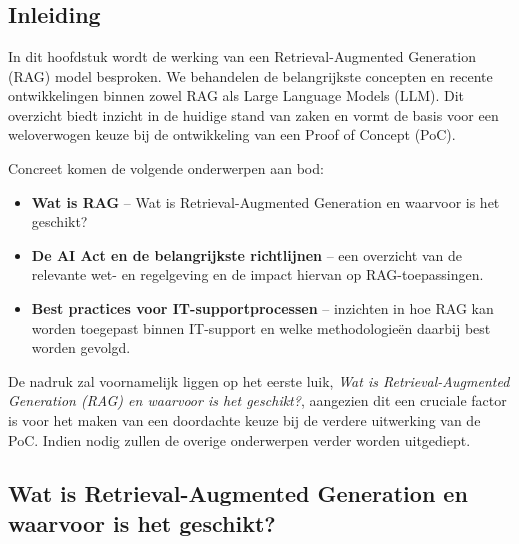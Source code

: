 \chapter{}%
\label{ch:stand-van-zaken}



\section{Inleiding}
In dit hoofdstuk wordt de werking van een Retrieval-Augmented Generation (RAG) model besproken. We behandelen de belangrijkste concepten en recente ontwikkelingen binnen zowel RAG als Large Language Models (LLM). Dit overzicht biedt inzicht in de huidige stand van zaken en vormt de basis voor een weloverwogen keuze bij de ontwikkeling van een Proof of Concept (PoC).

Concreet komen de volgende onderwerpen aan bod:
\begin{itemize}
    \item \textbf{Wat is RAG} – Wat is Retrieval-Augmented Generation en waarvoor is het geschikt?
    \item \textbf{De AI Act en de belangrijkste richtlijnen} – een overzicht van de relevante wet- en regelgeving en de impact hiervan op RAG-toepassingen.
    \item \textbf{Best practices voor IT-supportprocessen} – inzichten in hoe RAG kan worden toegepast binnen IT-support en welke methodologieën daarbij best worden gevolgd.
\end{itemize}

De nadruk zal voornamelijk liggen op het eerste luik, \textit{Wat is Retrieval-Augmented Generation (RAG) en waarvoor is het geschikt?}, aangezien dit een cruciale factor is voor het maken van een doordachte keuze bij de verdere uitwerking van de PoC. Indien nodig zullen de overige onderwerpen verder worden uitgediept.

\section{Wat is Retrieval-Augmented Generation en waarvoor is het geschikt?}
 
